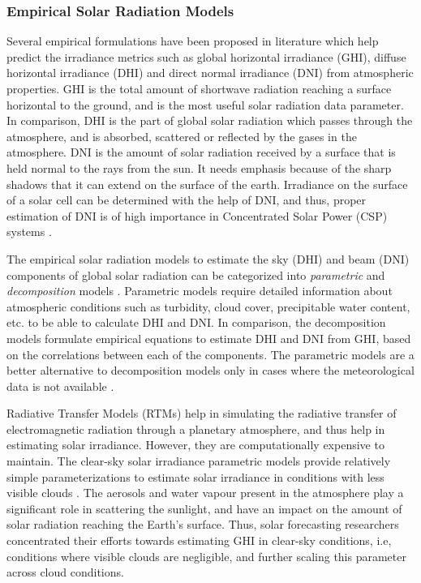\subsubsection*{Empirical Solar Radiation Models}
\par  Several empirical formulations have been proposed in literature which help predict the irradiance metrics such as global horizontal irradiance (GHI), diffuse horizontal irradiance (DHI) and direct normal irradiance (DNI) from atmospheric properties. GHI is the total amount of shortwave radiation reaching a surface horizontal to the ground, and is the most useful solar radiation data parameter. In comparison, DHI is the part of global solar radiation which passes through the atmosphere, and is absorbed, scattered or reflected by the gases in the atmosphere. DNI is the amount of solar radiation received by a surface that is held normal to the rays from the sun. It needs emphasis because of the sharp shadows that it can extend on the surface of the earth. Irradiance on the surface of a solar cell can be determined with the help of DNI, and thus, proper estimation of DNI is of high importance in Concentrated Solar Power (CSP) systems \cite{litrev_pvlib2}.


\par The empirical solar radiation models to estimate the sky (DHI) and beam (DNI) components of global solar radiation can be categorized into \textit{parametric} and \textit{decomposition} models \cite{litrev_pvlib3}. Parametric models require detailed information about atmospheric conditions such as turbidity, cloud cover, precipitable water content, etc. to be able to calculate DHI and DNI. In comparison, the decomposition models formulate empirical equations to estimate DHI and DNI from GHI, based on the correlations between each of the components. The parametric models are a better alternative to decomposition models only in cases where the meteorological data is not available \cite{litrev_pvlib3}\cite{litrev_pvlib4}.

\par Radiative Transfer Models (RTMs) help in simulating the radiative transfer of electromagnetic radiation through a planetary atmosphere, and thus help in estimating solar irradiance. However, they are computationally expensive to maintain. The clear-sky solar irradiance parametric models provide relatively simple parameterizations to estimate solar irradiance in conditions with less visible clouds \cite{litrev_pvlib8}. The aerosols and water vapour present in the atmosphere play a significant role in scattering the sunlight, and have an impact on the amount of solar radiation reaching the Earth's surface. Thus, solar forecasting researchers concentrated their efforts towards estimating GHI in clear-sky conditions, i.e, conditions where visible clouds are negligible, and further scaling this parameter across cloud conditions. 

